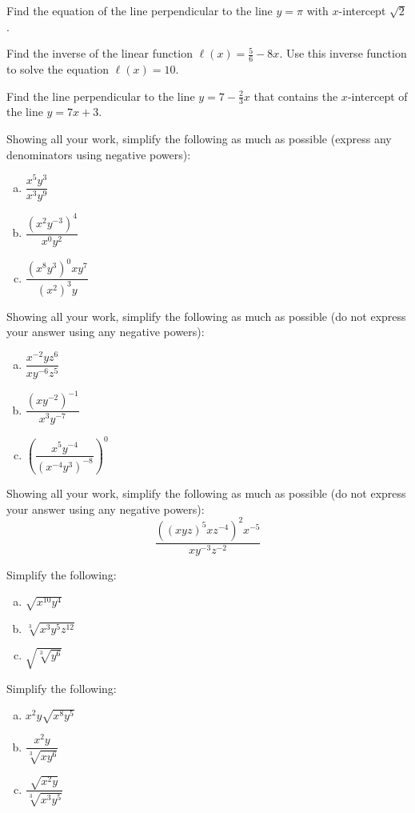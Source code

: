 \documentclass[11pt,letterpaper]{article}
\begin{document}
\prob Find the equation of the line perpendicular to the line $y= \pi$ with $x$-intercept $\sqrt{2}$. \pspace 


\prob Find the inverse of the linear function $\ell(x)= \frac{5}{6} - 8x$. Use this inverse function to solve the equation $\ell(x)= 10$. \pspace


\prob Find the line perpendicular to the line $y= 7 - \frac{2}{3}x$ that contains the $x$-intercept of the line $y= 7x + 3$. \pspace


\prob Showing all your work, simplify the following as much as possible (express any denominators using negative powers):
	\begin{enumerate}[(a)]
	\item $\dfrac{x^5 y^3}{x^3 y^9}$
	\item $\dfrac{(x^2 y^{-3})^4}{x^0 y^2}$
	\item $\dfrac{(x^8 y^3)^0 x y^7}{(x^2)^3 y}$
	\end{enumerate} \pspace


\prob Showing all your work, simplify the following as much as possible (do not express your answer using any negative powers): 
	\begin{enumerate}[(a)]
	\item $\dfrac{x^{-2} y z^6}{x y^{-6} z^5}$
	\item $\dfrac{(x y^{-2})^{-1}}{x^3 y^{-7}}$
	\item $\left( \dfrac{x^5 y^{-4}}{(x^{-4} y^3)^{-8}} \right)^0$
	\end{enumerate} \pspace


\prob Showing all your work, simplify the following as much as possible (do not express your answer using any negative powers): 
	\[
	\dfrac{\left( (x y z)^5 x z^{-4} \right)^2 x^{-5}}{x y^{-3} z^{-2}}
	\] \pspace





\newpage





\prob Simplify the following:
	\begin{enumerate}[(a)]
	\item $\sqrt{x^{10} y^4}$
	\item $\sqrt[3]{x^3 y^5 z^{12}}$
	\item $\sqrt{\sqrt[3]{y^6}}$
	\end{enumerate} \pspace  	


\prob Simplify the following:
	\begin{enumerate}[(a)]
	\item $x^2 y \sqrt{x^8 y^5}$
	\item $\dfrac{x^2 y}{\sqrt[3]{x y^6}}$
	\item $\dfrac{\sqrt{x^2 y}}{\sqrt[3]{x^3 y^5}}$
	\end{enumerate} \pspace  
\end{document}

